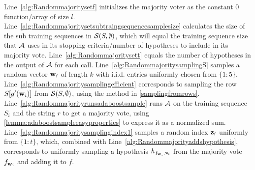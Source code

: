 Line~\ref{alg:Randommajoritysetf} initializes the majority voter as the constant $0$ function/array of size $ l.$
Line~\ref{alg:Randommajoritysetsubtraingsequencesamplesize} calculates the size of the sub training sequences in $ \mathcal{S}(S,\emptyset) $, which will equal the training sequence size that $ \mathcal{A} $ uses in its stopping criteria/number of hypotheses to include in its majority vote.
Line~\ref{alg:Randommajoritysett} equals the number of hypotheses in the output of $\mathcal{A}$ for each call.
Line~\ref{alg:RandommajoritysamplingS} samples a random vector $\mathbf{w}_{i}$ of length $k$ with i.i.d. entries uniformly chosen from $\{1:5\}$.
Line~\ref{alg:Randommajoritysamplingefficient} corresponds to sampling the row $S[g'(\mathbf{w}_{i})]$ from $\mathcal{S}(S,\emptyset)$, using the method in \cref{samplingfromrows}.
Line~\ref{alg:Randommajorityrunsadaboostsample} runs $\mathcal{A}$ on the training sequence $S_{i}$ and the string $r$ to get a majority vote, using \cref{lemma:adaboostsampleeasyproperties} to express it as a normalized sum. 
Line~\ref{alg:Randommajoritysamplingindex1} samples a random index $\mathbf{z}_{i}$ uniformly from $\{1:t\}$, which, combined with Line~\ref{alg:Randommajorityaddshypothesis}, corresponds to uniformly sampling a hypothesis $h_{f_{\mathbf{w}_{i}},\mathbf{z}_{i}}$ from the majority vote $f_{\mathbf{w}_{i}}$ and adding it to $ f $.  

